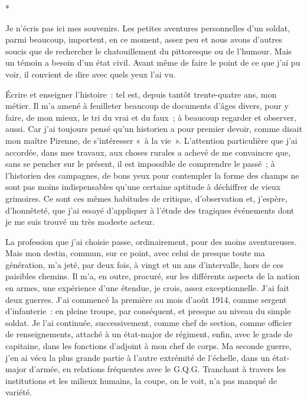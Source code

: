 \documentclass[french,twoside]{book} %
\begin{document}
\begin{center}
*\end{center}
\noindent Je n’écris pas ici mes souvenirs. Les petites aventures personnelles d’un soldat, parmi beaucoup, importent, en ce moment, assez peu et nous avons d’autres soucis que de rechercher le chatouillement du pittoresque ou de l’humour. Mais un témoin a besoin d’un état civil. Avant même de faire le point   de ce que j’ai pu voir, il convient de dire avec quels yeux l’ai vu.\par
Écrire et enseigner l’histoire : tel est, depuis tantôt trente-quatre ans, mon métier. Il m’a amené à feuilleter beaucoup de documents d’âges divers, pour y faire, de mon mieux, le tri du vrai et du faux ; à beaucoup regarder et observer, aussi. Car j’ai toujours pensé qu’un historien a pour premier devoir, comme disait mon maître Pirenne, de s’intéresser « à la vie ». L’attention particulière que j’ai accordée, dans mes travaux, aux choses rurales a achevé de me convaincre que, sans se pencher sur le présent, il est impossible de comprendre le passé ; à l’historien des campagnes, de bons yeux pour contempler la forme des champs ne sont pas moins indispensables qu’une certaine aptitude à déchiffrer de vieux grimoires. Ce sont ces mêmes habitudes de critique, d’observation et, j’espère, d’honnêteté, que j’ai essayé d’appliquer à l’étude des tragiques événements dont je me suis trouvé un très modeste acteur.\par
La profession que j’ai choisie passe, ordinairement, pour des moins aventureuses. Mais mon destin, commun, sur ce point, avec celui de presque toute ma génération, m’a jeté, par deux fois, à vingt et un ans d’intervalle, hors de ces paisibles chemins. Il m’a, en outre, procuré, sur les différents aspects de la nation en armes, une expérience d’une étendue, je crois, assez exceptionnelle. J’ai fait deux guerres. J’ai commencé la première au mois d’août 1914, comme sergent d’infanterie : en pleine troupe, par conséquent, et presque au niveau du simple soldat. Je l’ai continuée, successivement, comme chef de section, comme officier de renseignements, attaché à un état-major de régiment, enfin, avec le grade de capitaine, dans les fonctions d’adjoint à mon chef de corps. Ma seconde guerre, j’en ai vécu la plus grande partie à l’autre extrémité de l’échelle, dans un état-major d’armée, en relations fréquentes   avec le G.Q.G. Tranchant à travers les institutions et les milieux humains, la coupe, on le voit, n’a pas manqué de variété.\par
\end{document}
